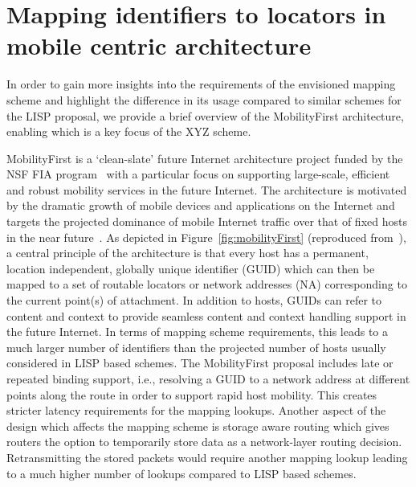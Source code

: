 \section{Mapping identifiers to locators in mobile centric architecture}

In order to gain more insights into the requirements of the envisioned mapping scheme and highlight the difference in its usage compared to similar schemes for the LISP proposal, we provide a brief overview of the MobilityFirst architecture, enabling which is a key focus of the XYZ scheme. 

MobilityFirst is a `clean-slate' future Internet architecture project funded by the NSF FIA program~\cite{fia} with a particular focus on supporting large-scale, efficient and robust mobility services in the future Internet. The architecture is motivated by the dramatic growth of mobile devices and applications on the Internet and targets the projected dominance of mobile Internet traffic over that of fixed hosts in the near future~\cite{cisco-2010}. As depicted in Figure~\ref{fig:mobilityFirst} (reproduced from~\cite{nelson-11}), a central principle of the architecture is that every host has a permanent, location independent, globally unique identifier (GUID) which can then be mapped to a set of routable locators or network addresses (NA) corresponding to the current point(s) of attachment. In addition to hosts, GUIDs can refer to content and context to provide seamless content and context handling support in the future Internet. In terms of mapping scheme requirements, this leads to a much larger number of identifiers than the projected number of hosts usually considered in LISP based schemes. The MobilityFirst proposal includes late or repeated binding support, i.e., resolving a GUID to a network address at different points along the route in order to support rapid host mobility. This creates stricter latency requirements for the mapping lookups. Another aspect of the design which affects the mapping scheme is storage aware routing which gives routers the option to temporarily store data as a network-layer routing decision. Retransmitting the stored packets would require another mapping lookup leading to a much higher number of lookups compared to LISP based schemes.

